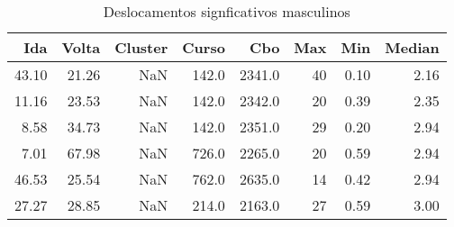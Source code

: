 \begin{table}
\centering
\caption{Deslocamentos signficativos masculinos}
\label{tab:Salarios_Desequlibrio_M}
\begin{tabular}{rrrrrrrr}
\toprule
  Ida &  Volta &  Cluster &  Curso &    Cbo &  Max &  Min &  Median \\
\midrule
43.10 &  21.26 &      NaN &  142.0 & 2341.0 &   40 & 0.10 &    2.16 \\
11.16 &  23.53 &      NaN &  142.0 & 2342.0 &   20 & 0.39 &    2.35 \\
 8.58 &  34.73 &      NaN &  142.0 & 2351.0 &   29 & 0.20 &    2.94 \\
 7.01 &  67.98 &      NaN &  726.0 & 2265.0 &   20 & 0.59 &    2.94 \\
46.53 &  25.54 &      NaN &  762.0 & 2635.0 &   14 & 0.42 &    2.94 \\
27.27 &  28.85 &      NaN &  214.0 & 2163.0 &   27 & 0.59 &    3.00 \\
\bottomrule
\end{tabular}
\end{table}
